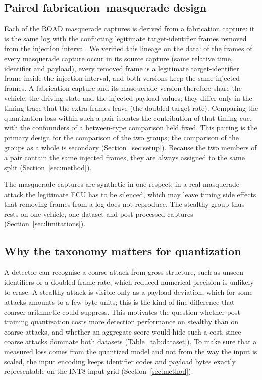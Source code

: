 

\subsection{Paired fabrication--masquerade design}
Each of the \NMasqCaptures{} ROAD masquerade captures is derived from a fabrication capture: it is the same log
with the conflicting legitimate target-identifier frames removed from the injection interval. We verified this
lineage on the data: \MasqInSourcePct{} of the frames of every masquerade capture occur in its source capture
(same relative time, identifier and payload), every removed frame is a legitimate target-identifier frame inside
the injection interval, and both versions keep the same injected frames. A fabrication capture and its masquerade
version therefore share the vehicle, the driving state and the injected payload values; they differ only in the
timing trace that the extra frames leave (the doubled target rate). Comparing the quantization loss within such a
pair isolates the contribution of that timing cue, with the confounders of a between-type comparison held fixed.
This pairing is the primary design for the comparison of the two groups; the comparison of the groups as a whole
is secondary (Section~\ref{sec:setup}). Because the two members of a pair contain the same injected frames, they
are always assigned to the same split (Section~\ref{sec:method}).

The masquerade captures are synthetic in one respect: in a real masquerade attack the legitimate ECU has to be
silenced, which may leave timing side effects that removing frames from a log does not reproduce. The stealthy
group thus rests on one vehicle, one dataset and post-processed captures (Section~\ref{sec:limitations}).

\subsection{Why the taxonomy matters for quantization}
A detector can recognise a coarse attack from gross structure, such as unseen identifiers or a doubled frame rate,
which reduced numerical precision is unlikely to erase. A stealthy attack is visible only as a payload deviation,
which for some attacks amounts to a few byte units; this is the kind of fine difference that coarser arithmetic
could suppress. This motivates the question whether post-training quantization costs more detection performance on
stealthy than on coarse attacks, and whether an aggregate score would hide such a cost, since coarse attacks
dominate both datasets (Table~\ref{tab:dataset}). To make sure that a measured loss comes from the quantized model
and not from the way the input is scaled, the input encoding keeps identifier codes and payload bytes exactly
representable on the INT8 input grid (Section~\ref{sec:method}).
